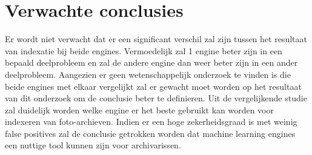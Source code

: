 \section{Verwachte conclusies}
\label{sec:verwachte_conclusies}
Er wordt niet verwacht dat er een significant verschil zal zijn tussen het resultaat van indexatie bij beide engines. Vermoedelijk zal 1 engine beter zijn in een bepaald deelprobleem en zal de andere engine dan weer beter zijn in een ander deelprobleem.
Aangezien er geen wetenschappelijk onderzoek te vinden is die beide engines met elkaar vergelijkt zal er gewacht moet worden op het resultaat van dit onderzoek om de conclusie beter te definieren.
Uit de vergelijkende studie zal duidelijk worden welke engine er het beste gebruikt kan worden voor indexeren van foto-archieven. Indien er een hoge zekerheidsgraad is met weinig false positives zal de conclusie getrokken worden dat machine learning engines een nuttige tool kunnen zijn voor archivarissen.

